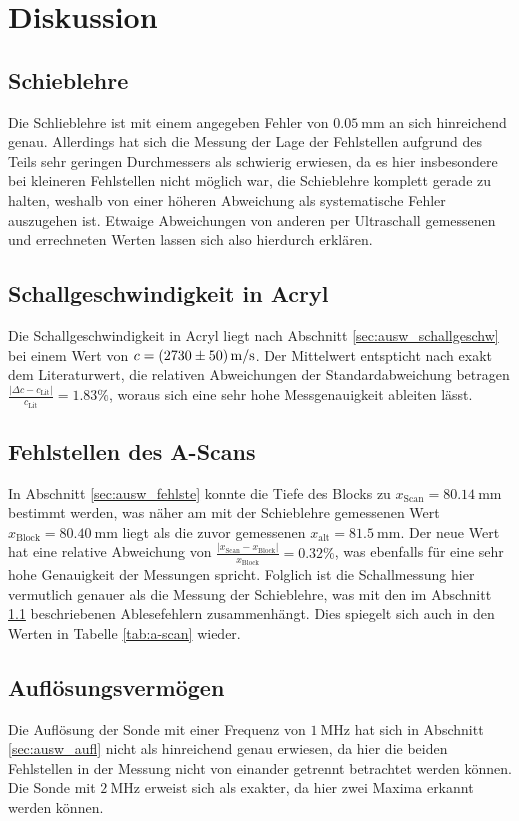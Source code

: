 \section{Diskussion}
\subsection{Schieblehre}
\label{sec:disk_schieb}
Die Schlieblehre ist mit einem angegeben Fehler von $\qty[]{0.05}{\milli\meter}$ an sich hinreichend genau.
Allerdings hat sich die Messung der Lage der Fehlstellen aufgrund des Teils sehr geringen Durchmessers als schwierig erwiesen, 
da es hier insbesondere bei kleineren Fehlstellen nicht möglich war, die Schieblehre komplett gerade zu halten,
weshalb von einer höheren Abweichung als systematische Fehler auszugehen ist.
Etwaige Abweichungen von anderen per Ultraschall gemessenen und errechneten Werten lassen sich also hierdurch erklären.

\subsection{Schallgeschwindigkeit in Acryl}
Die Schallgeschwindigkeit in Acryl liegt nach Abschnitt \ref{sec:ausw_schallgeschw} bei einem Wert von $c = \qty{2730 +- 50}{\meter\per\second}$.
Der Mittelwert entspticht nach \cite[]{schall-acryl} exakt dem Literaturwert, die relativen Abweichungen der Standardabweichung betragen
$\frac{|\Delta c - c_\text{Lit}|}{c_\text{Lit}} = \num{1.83} \%$, woraus sich eine sehr hohe Messgenauigkeit ableiten lässt.

\subsection{Fehlstellen des A-Scans}
In Abschnitt \ref{sec:ausw_fehlste} konnte die Tiefe des Blocks zu $x_\text{Scan} = \qty{80.14}{\mm}$ bestimmt werden, 
was näher am mit der Schieblehre gemessenen Wert $x_\text{Block} = \qty{80.40}{\mm}$ liegt als die zuvor gemessenen $x_\text{alt} = \qty{81.5}{\mm}$.
Der neue Wert hat eine relative Abweichung von $\frac{|x_\text{Scan} - x_\text{Block}|}{x_\text{Block}} = \num{0.32} \%$,
was ebenfalls für eine sehr hohe Genauigkeit der Messungen spricht.
Folglich ist die Schallmessung hier vermutlich genauer als die Messung der Schieblehre, was mit den im Abschnitt \ref{sec:disk_schieb}
beschriebenen Ablesefehlern zusammenhängt.
Dies spiegelt sich auch in den Werten in Tabelle \ref{tab:a-scan} wieder.

\subsection{Auflösungsvermögen}
Die Auflösung der Sonde mit einer Frequenz von $\qty[]{1}{\mega\hertz}$ hat sich in Abschnitt \ref{sec:ausw_aufl} nicht als hinreichend 
genau erwiesen, da hier die beiden Fehlstellen in der Messung nicht von einander getrennt betrachtet werden können.
Die Sonde mit $\qty[]{2}{\mega\hertz}$ erweist sich als exakter, da hier zwei Maxima erkannt werden können.

